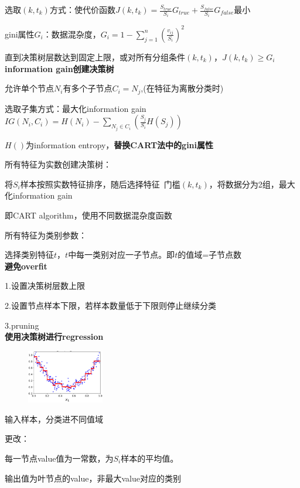 \documentclass[UTF8]{ctexart}
\begin{document}
  \quad 选取$(k, t_k)$方式：使代价函数$J(k, t_k) = \frac{S_{true}}{S_i}G_{true} + \frac{S_{false}}{S_i}G_{false}$最小

  \quad gini属性$G_i$：数据混杂度，$G_i = 1-\sum_{j=1}^{n}(\frac{v_{ij}}{S_i})^2$

  直到决策树层数达到固定上限，或对所有分组条件$(k, t_k)$，$J(k, t_k) \geq G_i$\\
\textbf{information gain创建决策树}

  允许单个节点$N_i$有多个子节点$C_i = {N_j}$,(在特征为离散分类时)

  选取子集方式：最大化information gain $IG(N_i, C_i) = H(N_i) - \sum_{N_j \in C_i}(\frac{S_j}{S_i}H(S_j))$
  
  \quad $H()$为information entropy，\textbf{替换CART法中的gini属性}
  
  所有特征为实数创建决策树：
  
  \quad 将$S_i$样本按照实数特征排序，随后选择特征\ 门槛$(k, t_k)$，将数据分为2组，最大化information gain

  \quad 即CART algorithm，使用不同数据混杂度函数
  
  所有特征为类别参数：
  
  \quad 选择类别特征$t$，$t$中每一类别对应一子节点。即$t$的值域=子节点数\\
\textbf{避免overfit}

  1.设置决策树层数上限

  2.设置节点样本下限，若样本数量低于下限则停止继续分类
  
  3.pruning\\
\textbf{使用决策树进行regression}

  \begin{figure}[H] %
    \centering %
    \includegraphics[width=0.3\textwidth]{note_images/deci_tree_regression.png} %
  \end{figure}

  输入样本，分类进不同值域

  更改：
  
  \quad 每一节点value值为一常数，为$S_i$样本的平均值。
  
  \quad 输出值为叶节点的value，非最大value对应的类别
\end{document}
